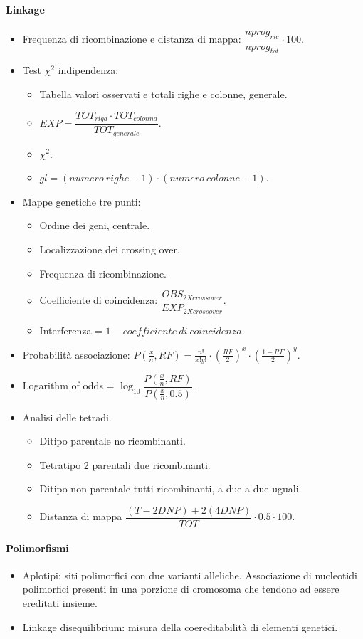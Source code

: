 \begin{multicols}{2}
\paragraph*{Linkage}
\begin{itemize}
	\item Frequenza di ricombinazione e distanza di mappa: $\dfrac{nprog_{ric}}{nprog_{tot}}\cdot 100$.
	\item Test $\chi^2$ indipendenza:
		\begin{itemize}
			\item Tabella valori osservati e totali righe e colonne, generale.
			\item $EXP = \dfrac{TOT_{riga} \cdot TOT_{colonna}}{TOT_{generale}}$.
			\item $\chi^2$.
			\item $gl = (numero\ righe -1)\cdot(numero\ colonne - 1)$.
		\end{itemize}
	\item Mappe genetiche tre punti:
		\begin{itemize}
			\item Ordine dei geni, centrale.
			\item Localizzazione dei crossing over.
			\item Frequenza di ricombinazione.
			\item Coefficiente di coincidenza: $\dfrac{OBS_{2Xcrossover}}{EXP_{2Xcrossover}}$.
			\item Interferenza = $1 - coefficiente\ di\ coincidenza$.
		\end{itemize}
	\item Probabilit\`a associazione: $P(\frac{x}{n}, RF) = \frac{n!}{x!y!}\cdot (\frac{RF}{2})^x\cdot(\frac{1-RF}{2})^y$.
	\item Logarithm of odds = $\log_{10} \dfrac{P(\frac{x}{n}, RF)}{P(\frac{x}{n}, 0.5)}$.
	\item Analisi delle tetradi.
		\begin{itemize}
			\item Ditipo parentale no ricombinanti.
			\item Tetratipo 2 parentali due ricombinanti.
			\item Ditipo non parentale tutti ricombinanti, a due a due uguali.
			\item Distanza di mappa $\dfrac{(T-2DNP) + 2(4DNP)}{TOT}\cdot 0.5\cdot 100$.
		\end{itemize}
\end{itemize}

\paragraph*{Polimorfismi}
\begin{itemize}
	\item Aplotipi: siti polimorfici con due varianti alleliche.
		Associazione di nucleotidi polimorfici presenti in una porzione di cromosoma che tendono ad essere ereditati insieme.
	\item Linkage disequilibrium: misura della coereditabilit\`a di elementi genetici.
\end{itemize}


\end{multicols}
